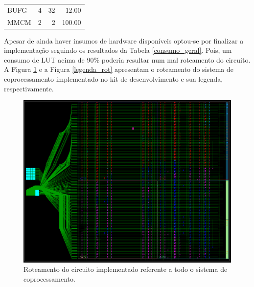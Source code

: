 \begin{table}[!h]
\begin{tabular}{lrrr}
		BUFG                                                          & 4                                                               & 32                                                              & 12.00                                                                \\
		\rowcolor[HTML]{DAE8FC} 
		MMCM                                                          & 2                                                               & 2                                                               & 100.00                                                              
	\end{tabular}
\end{table}

Apesar de ainda haver insumos de hardware disponíveis optou-se por finalizar a implementação seguindo os resultados da Tabela \ref{consumo_geral}. Pois, um consumo de LUT acima de 90\% poderia resultar num mal roteamento do circuito.\\

A Figura \ref{roteamento} e a Figura \ref{legenda_rot} apresentam o roteamento do sistema de coprocessamento implementado no kit de desenvolvimento e sua legenda, respectivamente.
\begin{figure}[!h]
	\centering
	\includegraphics[keepaspectratio=true,scale=0.40]{figuras/roteamento.PNG}
	\caption{Roteamento do circuito implementado referente a todo o sistema de coprocessamento.}
	\label{roteamento}
\end{figure}


